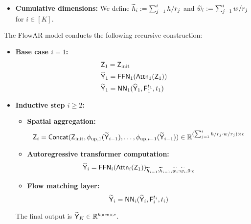 \begin{definition}
\begin{itemize}
        \item {\bf Cumulative dimensions:} We define $\widetilde{h}_i := \sum_{j=1}^i h/r_j$ and  $\widetilde{w}_i := \sum_{j=1}^i w/r_j$ for $i \in [K]$.
    \end{itemize}
    The FlowAR model conducts the following recursive construction:
    \begin{itemize}
        \item {\bf Base case $i=1$:}
        \begin{align*}
            &~\mathsf{Z}_1 = \mathsf{Z}_{\mathrm{init}}\\
            &~\widehat{\mathsf{Y}}_1 = \mathsf{FFN}_1(\mathsf{Attn}_1(\mathsf{Z}_1))\\
            &~\widetilde{\mathsf{Y}}_1 = \mathsf{NN}_1(\widehat{\mathsf{Y}}_1,\mathsf{F}_{1}^{t_1},t_1)
        \end{align*}
        \item {\bf Inductive step $i \geq 2$:}
        \begin{itemize}
            \item {\bf Spatial aggregation:}
            \begin{align*}
                \mathsf{Z}_i = \mathsf{Concat}(\mathsf{Z}_{\mathrm{init}},\phi_{\mathrm{up},1}(\widetilde{\mathsf{Y}}_{i-1}),\dots,\phi_{\mathrm{up},i-1}(\widetilde{\mathsf{Y}}_{i-1})) \in \mathbb{R}^{(\sum_{j=1}^i h/r_j \cdot w/r_j)\times c}
            \end{align*}
            \item {\bf Autoregressive transformer computation:}
            \begin{align*}
                \widehat{\mathsf{Y}}_i = \mathsf{FFN}_i(\mathsf{Attn}_i(\mathsf{Z}_1))_{\widetilde{h}_{i-1}:\widetilde{h}_{i-1},\widetilde{w}_{i}:\widetilde{w}_{i},0:c}
            \end{align*}
            \item {\bf Flow matching layer:}
            \begin{align*}
                \widetilde{\mathsf{Y}}_i = \mathsf{NN}_i(\widehat{\mathsf{Y}}_i,\mathsf{F}_{i}^{t_i},t_i)
            \end{align*}
        \end{itemize}
        The final output is $\widetilde{\mathsf{Y}}_K \in \mathbb{R}^{h \times w \times c}$.
    \end{itemize}
   
\end{definition}

